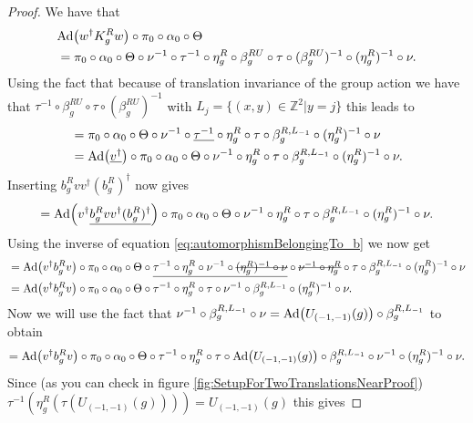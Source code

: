 \documentclass[12pt,a4paper,twoside]{article}
\newcommand{\stkout}[1]{\ifmmode\text{\sout{\ensuremath{#1}}}\else\sout{#1}\fi}
\let\originalleft\left
\let\originalright\right
\renewcommand{\left}{\mathopen{}\mathclose\bgroup\originalleft}
\renewcommand{\right}{\aftergroup\egroup\originalright}
\newcommand{\ZZ}{\mathbb Z}
\newcommand{\Ad}[1]{\textrm{Ad}\left(#1\right)}
\theoremstyle{definition}
\numberwithin{equation}{section}
\begin{document}
\begin{proof}
	We have that
	\begin{align}
		&\Ad{w^\dagger K_g^R w}\circ\pi_0\circ\alpha_0\circ\Theta\\
		&=\pi_0\circ\alpha_0\circ\Theta\circ\nu^{-1}\circ\tau^{-1}\circ\eta_g^R\circ\beta_g^{RU}\circ\tau\circ(\beta_g^{RU})^{-1}\circ(\eta_g^R)^{-1}\circ\nu.
	\end{align}
	Using the fact that because of translation invariance of the group action we have that $\tau^{-1}\circ\beta_g^{RU}\circ\tau\circ(\beta_g^{RU})^{-1}$ with $L_j=\{(x,y)\in\ZZ^2|y=j\}$ this leads to
	\begin{align}
		&=\pi_0\circ\alpha_0\circ\Theta\circ\nu^{-1}\circ\underline{\tau^{-1}}\circ\eta_g^R\circ\tau\circ\beta_g^{R,L_{-1}}\circ(\eta_g^R)^{-1}\circ\nu\\
		&=\Ad{\underline{v^\dagger}}\circ \pi_0\circ\alpha_0\circ\Theta\circ\nu^{-1}\circ\eta_g^R\circ\tau\circ\beta_g^{R,L_{-1}}\circ(\eta_g^R)^{-1}\circ\nu.
	\end{align}
	Inserting $b^R_g v v^\dagger (b^R_g)^\dagger$ now gives
	\begin{equation}
		=\Ad{v^\dagger\underline{b^R_g v v^\dagger (b^R_g)^\dagger}}\circ \pi_0\circ\alpha_0\circ\Theta\circ\nu^{-1}\circ\eta_g^R\circ\tau\circ\beta_g^{R,L_{-1}}\circ(\eta_g^R)^{-1}\circ\nu.
	\end{equation}
	 Using the inverse of equation \eqref{eq:automorphismBelongingTo_b} we now get
	\begin{align}
		&=\Ad{v^\dagger b^R_g v }\circ \pi_0\circ\alpha_0\circ\Theta\circ\underline{\tau^{-1}\circ\eta_g^R\circ\nu^{-1}\circ\stkout{(\eta_g^R)^{-1}\circ\nu}}\circ\stkout{\nu^{-1}\circ\eta_g^R}\circ\tau\circ\beta_g^{R,L_{-1}}\circ(\eta_g^R)^{-1}\circ\nu\\
		&=\Ad{v^\dagger b_g^R v}\circ\pi_0\circ\alpha_0\circ\Theta\circ\tau^{-1}\circ\eta_g^R\circ\tau\circ\nu^{-1}\circ\beta_g^{R,L_{-1}}\circ(\eta_g^R)^{-1}\circ\nu.
	\end{align}
	Now we will use the fact that $\nu^{-1}\circ\beta_g^{R,L_{-1}}\circ\nu=\Ad{U_{(-1,-1)}(g)}\circ\beta_g^{R,L_{-1}}$ to obtain
	\begin{equation}
		=\Ad{v^\dagger b_g^R v}\circ\pi_0\circ\alpha_0\circ\Theta\circ\tau^{-1}\circ\eta_g^R\circ\tau\circ\Ad{U_{(-1,-1)}(g)}\circ\beta_g^{R,L_{-1}}\circ\nu^{-1}\circ(\eta_g^R)^{-1}\circ\nu.
	\end{equation}
	Since (as you can check in figure \ref{fig:SetupForTwoTranslationsNearProof}) $\tau^{-1}(\eta_g^R(\tau(U_{(-1,-1)}(g))))=U_{(-1,-1)}(g)$ this gives

\end{proof}
\end{document}
